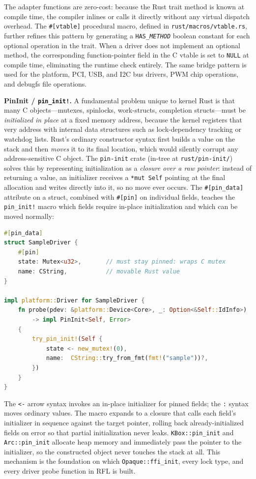 \noindent
The adapter functions are zero-cost: because the Rust trait method is known at compile time, the
compiler inlines or calls it directly without any virtual dispatch overhead.
The \texttt{\#[vtable]} procedural macro, defined in \texttt{rust/macros/vtable.rs}, further
refines this pattern by generating a \texttt{HAS\_\textit{METHOD}} boolean constant for each
optional operation in the trait.
When a driver does not implement an optional method, the corresponding function-pointer field in
the C vtable is set to \texttt{NULL} at compile time, eliminating the runtime check entirely.
The same bridge pattern is used for the platform, PCI, USB, and I2C bus drivers, PWM chip
operations, and debugfs file operations.

\textbf{PinInit / \texttt{pin\_init!}.}
A fundamental problem unique to kernel Rust is that many C objects---mutexes, spinlocks,
work-structs, completion structs---must be \emph{initialized in place} at a fixed memory address,
because the kernel registers that very address with internal data structures such as lock-dependency
tracking or watchdog lists.
Rust's ordinary constructor syntax first builds a value on the stack and then \emph{moves} it to
its final location, which would silently corrupt any address-sensitive C object.
The \texttt{pin-init} crate (in-tree at \texttt{rust/pin-init/}) solves this by representing
initialization as a \emph{closure over a raw pointer}: instead of returning a value, an initializer
receives a \texttt{*mut Self} pointing at the final allocation and writes directly into it, so no
move ever occurs.
The \texttt{\#[pin\_data]} attribute on a struct, combined with \texttt{\#[pin]} on individual
fields, teaches the \texttt{pin\_init!} macro which fields require in-place initialization and
which can be moved normally:

\begin{lstlisting}[language=Rust,columns=fullflexible]
#[pin_data]
struct SampleDriver {
    #[pin]
    state: Mutex<u32>,       // must stay pinned: wraps C mutex
    name: CString,           // movable Rust value
}

impl platform::Driver for SampleDriver {
    fn probe(pdev: &platform::Device<Core>, _: Option<&Self::IdInfo>)
        -> impl PinInit<Self, Error>
    {
        try_pin_init!(Self {
            state <- new_mutex!(0),
            name:  CString::try_from_fmt(fmt!("sample"))?,
        })
    }
}
\end{lstlisting}

\noindent
The \texttt{<-} arrow syntax invokes an in-place initializer for pinned fields; the \texttt{:}
syntax moves ordinary values.
The macro expands to a closure that calls each field's initializer in sequence against the target
pointer, rolling back already-initialized fields on error so that partial initialization never
leaks.
\texttt{KBox::pin\_init} and \texttt{Arc::pin\_init} allocate heap memory and immediately pass the
pointer to the initializer, so the constructed object never touches the stack at all.
This mechanism is the foundation on which \texttt{Opaque::ffi\_init}, every lock type, and every
driver probe function in RFL is built.

